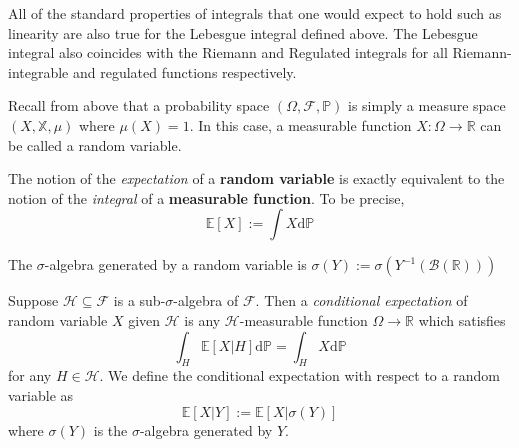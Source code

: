 \begin{remark}
    All of the standard properties of integrals that one would expect
    to hold such as linearity are also true for the Lebesgue integral 
    defined above. The Lebesgue integral also coincides with the Riemann
    and Regulated integrals for all Riemann-integrable and regulated functions respectively.
\end{remark}

\begin{definition}
    Recall from above that a probability space $(\Omega,\mathcal{F},\mathbb{P})$
    is simply a measure space $(X,\mathbb{X},\mu)$ where $\mu(X)=1.$ In this case,
    a measurable function $X:\Omega\rightarrow\mathbb{R}$ can be called
    a random variable. 
\end{definition}

\begin{definition}[Expectation]
    The notion of the \emph{expectation} of a \textbf{random variable} is exactly equivalent
    to the notion of the \emph{integral} of a \textbf{measurable function}.
    To be precise,
    \begin{equation}
        \mathbb{E}[X]:=\int X\mathrm d\mathbb{P}
    \end{equation}
\end{definition}

\begin{definition}
    The $\sigma$-algebra generated by a random variable is
    $\sigma(Y):=\sigma(Y^{-1}(\mathcal{B}(\mathbb{R})))$
\end{definition}

\begin{definition}
    Suppose $\mathcal{H}\subseteq\mathcal{F}$ is a sub-$\sigma$-algebra
    of $\mathcal{F}.$ Then a \emph{conditional expectation} of random variable
    $X$ given $\mathcal{H}$ is any $\mathcal{H}$-measurable function $\Omega\rightarrow\mathbb{R}$
    which satisfies
    \begin{equation}
        \int_H \mathbb{E}[X|H]\mathrm d\mathbb{P}=\int_H X\mathrm d\mathbb{P}
    \end{equation}
    for any $H\in\mathcal{H}$. We define the conditional expectation with respect
    to a random variable as 
    \begin{equation}
        \mathbb{E}[X|Y]:=\mathbb{E}[X|\sigma(Y)]
    \end{equation}
    where $\sigma(Y)$ is the $\sigma$-algebra generated by $Y$.
\end{definition}

